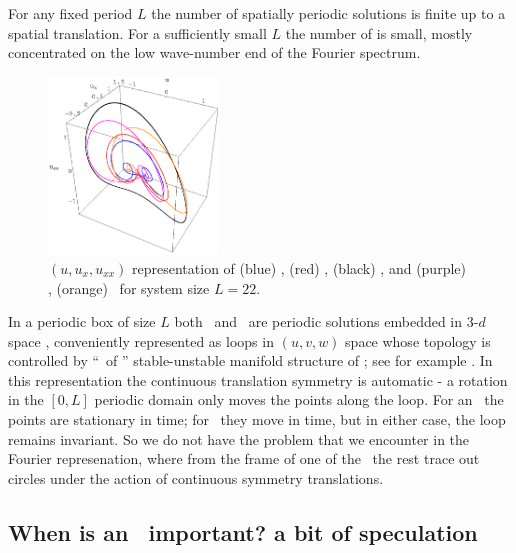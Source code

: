 For any fixed period $L$ the number 
of spatially periodic solutions is finite up to a spatial translation.
For a sufficiently small $L$ 
the number of {\eqva} is small,
mostly
concentrated on the low wave-number end of the Fourier spectrum.

\begin{figure}[t] \label{f:eqvSpatial}
\begin{center} 
\includegraphics[width=0.4\textwidth]{figs/equilSpatial.eps}
\end{center}
\caption{
$(u,u_x,u_{xx})$ representation
of (blue) , (red) ,  (black)  \eqva,
 and (purple) , (orange)  \reqva\ for
system size $L=22$. %
        }
\end{figure}

In a periodic box of size $L$
both \eqva\ and \reqva\ are  periodic solutions 
embedded in 3-$d$ space , 
conveniently represented as loops in 
$(u,v,w)$ space whose topology is controlled by
``\eqva\ of \eqva'' stable-unstable manifold structure of
; see for example .
In this representation the continuous translation symmetry
is automatic - a rotation in the $[0,L]$ periodic domain only
moves the points along the loop. For an \eqv\ the points
are stationary in time; for \reqv\ they move in time, but in
either case, the loop remains invariant.
So we do not have the problem that we encounter in the Fourier 
represenation, where from the frame of one of the \eqva\
the rest trace out circles under the action of continuous symmetry 
translations.


\subsection{When is an \eqv\ important? a bit of speculation} 

